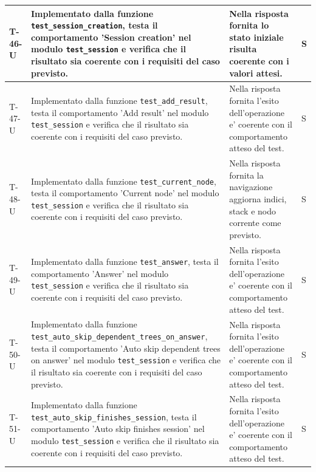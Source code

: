 \documentclass[a4paper,12pt]{article}
\begin{document}
{{\begin{longtable}{|>{\RaggedRight\arraybackslash}p{1.55cm}|>{\RaggedRight\arraybackslash}p{8.0cm}|>{\RaggedRight\arraybackslash}p{4.6cm}|>{\RaggedRight\arraybackslash}p{1.2cm}|}
        \hline
        T-46-U & Implementato dalla funzione \texttt{test\_\allowbreak session\_\allowbreak creation}, testa il comportamento 'Session creation' nel modulo \texttt{test\_\allowbreak session} e verifica che il risultato sia coerente con i requisiti del caso previsto. & Nella risposta fornita lo stato iniziale risulta coerente con i valori attesi. & S \\
        \hline
        T-47-U & Implementato dalla funzione \texttt{test\_\allowbreak add\_\allowbreak result}, testa il comportamento 'Add result' nel modulo \texttt{test\_\allowbreak session} e verifica che il risultato sia coerente con i requisiti del caso previsto. & Nella risposta fornita l'esito dell'operazione e' coerente con il comportamento atteso del test. & S \\
        \hline
        T-48-U & Implementato dalla funzione \texttt{test\_\allowbreak current\_\allowbreak node}, testa il comportamento 'Current node' nel modulo \texttt{test\_\allowbreak session} e verifica che il risultato sia coerente con i requisiti del caso previsto. & Nella risposta fornita la navigazione aggiorna indici, stack e nodo corrente come previsto. & S \\
        \hline
        T-49-U & Implementato dalla funzione \texttt{test\_\allowbreak answer}, testa il comportamento 'Answer' nel modulo \texttt{test\_\allowbreak session} e verifica che il risultato sia coerente con i requisiti del caso previsto. & Nella risposta fornita l'esito dell'operazione e' coerente con il comportamento atteso del test. & S \\
        \hline
        T-50-U & Implementato dalla funzione \texttt{test\_\allowbreak auto\_\allowbreak skip\_\allowbreak dependent\_\allowbreak trees\_\allowbreak on\_\allowbreak answer}, testa il comportamento 'Auto skip dependent trees on answer' nel modulo \texttt{test\_\allowbreak session} e verifica che il risultato sia coerente con i requisiti del caso previsto. & Nella risposta fornita l'esito dell'operazione e' coerente con il comportamento atteso del test. & S \\
        \hline
        T-51-U & Implementato dalla funzione \texttt{test\_\allowbreak auto\_\allowbreak skip\_\allowbreak finishes\_\allowbreak session}, testa il comportamento 'Auto skip finishes session' nel modulo \texttt{test\_\allowbreak session} e verifica che il risultato sia coerente con i requisiti del caso previsto. & Nella risposta fornita l'esito dell'operazione e' coerente con il comportamento atteso del test. & S \\

\end{longtable}}}
\end{document}
